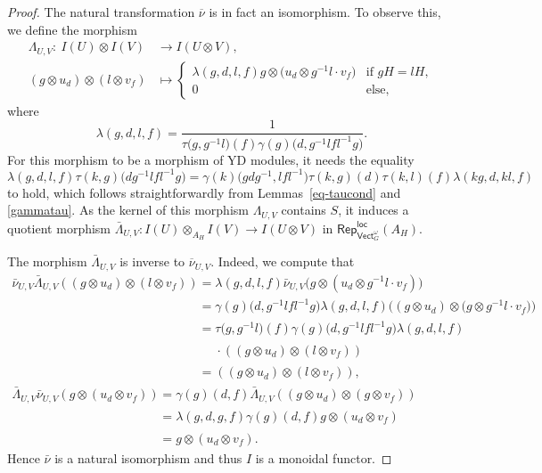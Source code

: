 \documentclass[pdftex]{sigma}
\numberwithin{equation}{section}
\newcommand{\ov}[1]{\overline{#1}}
\newcommand{\locmod}{\mathsf{Rep}^{\mathsf{loc}}}
\newcommand{\Vect}{\mathsf{Vect}}
\newcommand{\rI}{I}
\begin{document}
\begin{proof}
The natural transformation $\ov{\nu}$ is in fact an isomorphism. To observe this, we define the morphism
\begin{align*}
 \Lambda_{U,V} \colon\ \rI(U) \otimes \rI(V) &\longrightarrow \rI(U \otimes V), \\
 (g \otimes u_d) \otimes (l \otimes v_f) &\mapsto
 \begin{cases}
 \lambda(g,d,l,f) g \otimes \big(u_d \otimes g^{-1}l \cdot v_f\big) & \text{if } gH=lH,\\
 0 & \text{else},
 \end{cases}
\end{align*}
where
\[\lambda(g,d,l,f) =\frac{1}{ \tau\big(g,g^{-1}l\big)(f)\gamma(g)\big(d,g^{-1}lfl^{-1}g\big)}. \]
For this morphism to be a morphism of YD modules, it needs the equality
\[
\lambda(g,d,l,f)\tau(k,g)\big(dg^{-1}lfl^{-1}g\big) = \gamma(k)\big(gdg^{-1},lfl^{-1}\big)\tau(k,g)(d)\tau(k,l)(f)\lambda(kg,d,kl,f)
\]
to hold, which follows straightforwardly from Lemmas~\ref{eq-taucond} and \ref{gammatau}. As the kernel of this morphism $\Lambda_{U,V}$ contains $S$, it induces a quotient morphism $\bar{\Lambda}_{U,V}\colon \rI(U) \otimes_{A_H} \rI(V) \to \rI(U \otimes V)$ in $\locmod_{\Vect_G^\omega}(A_H)$.


{\samepage The morphism $\bar{\Lambda}_{U,V}$ is inverse to $\ov{\nu}_{U,V}$. Indeed, we compute that
\begin{gather*}
 \bar{\nu}_{U,V}\bar{\Lambda}_{U,V}((g\otimes u_d) \otimes (l \otimes v_f)) = \lambda(g,d,l,f)\bar{\nu}_{U,V}\big(g \otimes (u_d \otimes g^{-1}l\cdot v_f)\big) \\
 \phantom{\bar{\nu}_{U,V}\bar{\Lambda}_{U,V}((g\otimes u_d) \otimes (l \otimes v_f)) }{}=\gamma(g)\big(d,g^{-1}lfl^{-1}g\big)\lambda(g,d,l,f)\big((g \otimes u_d) \otimes \big(g \otimes g^{-1}l\cdot v_f\big)\big)\\
\phantom{\bar{\nu}_{U,V}\bar{\Lambda}_{U,V}((g\otimes u_d) \otimes (l \otimes v_f)) }{} =\tau\big(g,g^{-1}l\big)(f)\gamma(g)\big(d,g^{-1}lfl^{-1}g\big)\lambda(g,d,l,f)\\
\phantom{\bar{\nu}_{U,V}\bar{\Lambda}_{U,V}((g\otimes u_d) \otimes (l \otimes v_f))= }{} \cdot ((g \otimes u_d) \otimes (l \otimes v_f))\\
\phantom{\bar{\nu}_{U,V}\bar{\Lambda}_{U,V}((g\otimes u_d) \otimes (l \otimes v_f)) }{} =((g \otimes u_d) \otimes (l \otimes v_f)),\\
 \bar{\Lambda}_{U,V}\bar{\nu}_{U,V}(g \otimes (u_d \otimes v_f)) =\gamma(g)(d,f) \bar{\Lambda}_{U,V}((g \otimes u_d) \otimes (g \otimes v_f)) \\
\phantom{\bar{\Lambda}_{U,V}\bar{\nu}_{U,V}(g \otimes (u_d \otimes v_f))}{} = \lambda(g,d,g,f)\gamma(g)(d,f)g \otimes (u_d \otimes v_f)\\
\phantom{\bar{\Lambda}_{U,V}\bar{\nu}_{U,V}(g \otimes (u_d \otimes v_f))}{} = g \otimes (u_d \otimes v_f).
\end{gather*}
Hence $\bar{\nu}$ is a natural isomorphism and thus $I$ is a monoidal functor.}


\end{proof}
\end{document}
